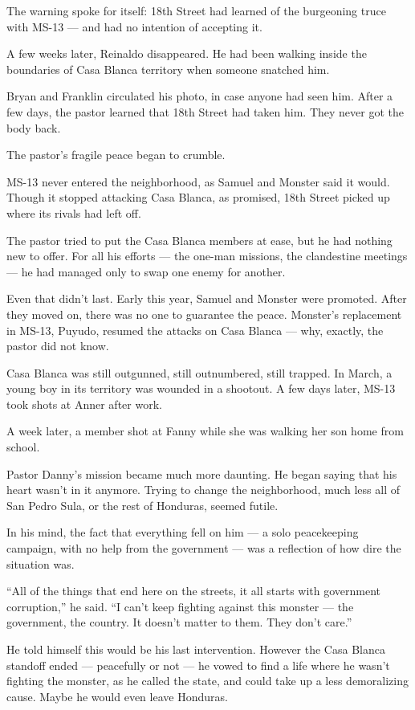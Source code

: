 The warning spoke for itself: 18th Street had learned of the burgeoning
truce with MS-13 --- and had no intention of accepting it.

A few weeks later, Reinaldo disappeared. He had been walking inside the
boundaries of Casa Blanca territory when someone snatched him.

Bryan and Franklin circulated his photo, in case anyone had seen him.
After a few days, the pastor learned that 18th Street had taken him.
They never got the body back.

The pastor's fragile peace began to crumble.

MS-13 never entered the neighborhood, as Samuel and Monster said it
would. Though it stopped attacking Casa Blanca, as promised, 18th Street
picked up where its rivals had left off.

The pastor tried to put the Casa Blanca members at ease, but he had
nothing new to offer. For all his efforts --- the one-man missions, the
clandestine meetings --- he had managed only to swap one enemy for
another.

Even that didn't last. Early this year, Samuel and Monster were
promoted. After they moved on, there was no one to guarantee the peace.
Monster's replacement in MS-13, Puyudo, resumed the attacks on Casa
Blanca --- why, exactly, the pastor did not know.

Casa Blanca was still outgunned, still outnumbered, still trapped. In
March, a young boy in its territory was wounded in a shootout. A few
days later, MS-13 took shots at Anner after work.

A week later, a member shot at Fanny while she was walking her son home
from school.

Pastor Danny's mission became much more daunting. He began saying that
his heart wasn't in it anymore. Trying to change the neighborhood, much
less all of San Pedro Sula, or the rest of Honduras, seemed futile.

In his mind, the fact that everything fell on him --- a solo
peacekeeping campaign, with no help from the government --- was a
reflection of how dire the situation was.

``All of the things that end here on the streets, it all starts with
government corruption,'' he said. ``I can't keep fighting against this
monster --- the government, the country. It doesn't matter to them. They
don't care.''

He told himself this would be his last intervention. However the Casa
Blanca standoff ended --- peacefully or not --- he vowed to find a life
where he wasn't fighting the monster, as he called the state, and could
take up a less demoralizing cause. Maybe he would even leave Honduras.

